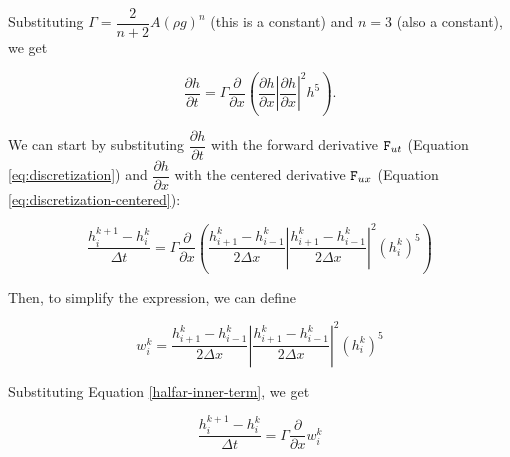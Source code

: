 \documentclass{article}
\begin{document}
\noindent Substituting $\Gamma = \dfrac{2}{n+2}A(\rho g)^n$ (this is a constant) and $n=3$ (also a constant), we get

\begin{equation}\label{eq:halfar}\dfrac{\partial h}{\partial t} = \Gamma \dfrac{\partial}{\partial x} \left(\dfrac{\partial h}{\partial x}\left|\dfrac{\partial h}{\partial x}\right|^{2} h^{5}\right).\end{equation}


\noindent We can start by substituting $\dfrac{\partial h}{\partial t}$ with the
forward derivative ${\tt F}_{ut}$ (Equation \ref{eq:discretization}) and
$\dfrac{\partial h}{\partial x}$ with the centered derivative ${\tt F}_{ux}$
(Equation \ref{eq:discretization-centered}):


\begin{equation}\label{halfar-step-1}
    \dfrac{h_i^{k+1}-h_i^k}{\Delta t} = \Gamma \dfrac{\partial}{\partial x} \left(\dfrac{h_{i+1}^{k}-h_{i-1}^k}{2\Delta x} \left|\dfrac{h_{i+1}^{k}-h_{i-1}^k}{2\Delta x}\right|^2(h_i^k)^5 \right)
\end{equation}


\noindent Then, to simplify the expression, we can define



\begin{equation}\label{halfar-inner-term}
    w_i^k =
    \dfrac{h_{i+1}^{k}-h_{i-1}^k}{2\Delta x} \left|\dfrac{h_{i+1}^{k}-h_{i-1}^k}{2\Delta x}\right|^2(h_i^k)^5
\end{equation}

\noindent Substituting Equation \ref{halfar-inner-term}, we get

\begin{equation}\label{halfar-step-2}
    \dfrac{h_i^{k+1}-h_i^k}{\Delta t} = \Gamma \dfrac{\partial}{\partial x} w_i^k
\end{equation}
\end{document}
